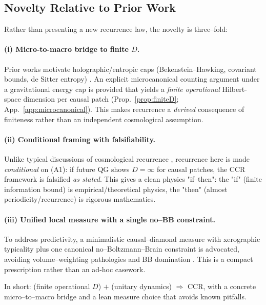 \documentclass[12pt]{article}
\theoremstyle{remark}
\begin{document}
\subsection{Novelty Relative to Prior Work}
\label{subsec:novelty}
Rather than presenting a new recurrence law, the novelty is three–fold:

\paragraph{(i) Micro-to-macro bridge to finite $D$.}
Prior works motivate holographic/entropic caps (Bekenstein–Hawking, covariant bounds, de Sitter entropy) \cite{Bekenstein1973,Hawking1975,Bousso1999}.
An explicit microcanonical counting argument under a gravitational energy cap is provided that yields a \emph{finite operational} Hilbert-space dimension per causal patch (Prop.~\ref{prop:finiteD}; App.~\ref{app:microcanonical}).
This makes recurrence a \emph{derived} consequence of finiteness rather than an independent cosmological assumption.

\paragraph{(ii) Conditional framing with falsifiability.}
Unlike typical discussions of cosmological recurrence \cite{DysonKlebanSusskind2002}, recurrence here is made \emph{conditional} on (A1): if future QG shows $D=\infty$ for causal patches, the CCR framework is falsified \emph{as stated}. 
This gives a clean physics "if–then": the "if" (finite information bound) is empirical/theoretical physics, the "then" (almost periodicity/recurrence) is rigorous mathematics.

\paragraph{(iii) Unified local measure with a single no–BB constraint.}
To address predictivity, a minimalistic causal–diamond measure with xerographic typicality plus one canonical no–Boltzmann–Brain constraint is advocated, avoiding volume–weighting pathologies and BB domination \cite{DysonKlebanSusskind2002,Page2007}.
This is a compact prescription rather than an ad-hoc casework.

\noindent In short: (finite operational $D$) $+$ (unitary dynamics) $\Rightarrow$ CCR, with a concrete micro–to–macro bridge and a lean measure choice that avoids known pitfalls.



\end{document}
